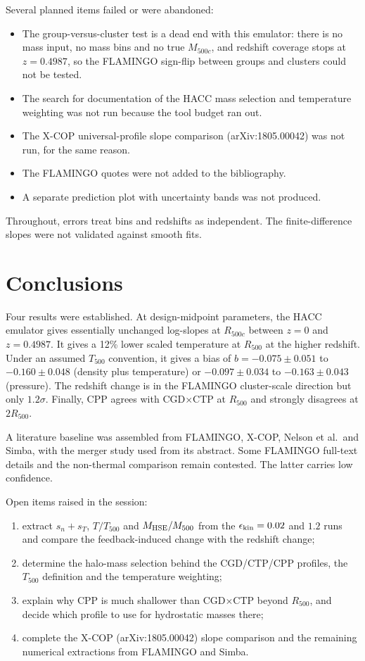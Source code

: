 \documentclass[11pt,a4paper]{article}
\begin{document}
Several planned items failed or were abandoned:
\begin{itemize}
\item The group-versus-cluster test is a dead end with this emulator: there is no mass input, no mass bins and no true $M_{500c}$, and redshift coverage stops at $z=0.4987$, so the FLAMINGO sign-flip between groups and clusters could not be tested.
\item The search for documentation of the HACC mass selection and temperature weighting was not run because the tool budget ran out.
\item The X-COP universal-profile slope comparison (arXiv:1805.00042) was not run, for the same reason.
\item The FLAMINGO quotes were not added to the bibliography.
\item A separate prediction plot with uncertainty bands was not produced.
\end{itemize}
Throughout, errors treat bins and redshifts as independent. The finite-difference slopes were not validated against smooth fits.

\section{Conclusions}

Four results were established. At design-midpoint parameters, the HACC emulator gives essentially unchanged log-slopes at $R_{500c}$ between $z=0$ and $z=0.4987$. It gives a 12\% lower scaled temperature at $R_{500}$ at the higher redshift. Under an assumed $T_{500}$ convention, it gives a bias of $b=-0.075\pm0.051$ to $-0.160\pm0.048$ (density plus temperature) or $-0.097\pm0.034$ to $-0.163\pm0.043$ (pressure). The redshift change is in the FLAMINGO cluster-scale direction but only $1.2\sigma$. Finally, CPP agrees with CGD$\times$CTP at $R_{500}$ and strongly disagrees at $2R_{500}$.

A literature baseline was assembled from FLAMINGO, X-COP, Nelson et al.\ and Simba, with the merger study used from its abstract. Some FLAMINGO full-text details and the non-thermal comparison remain contested. The latter carries low confidence.

Open items raised in the session:
\begin{enumerate}
\item extract $s_n+s_T$, $T/T_{500}$ and $M_{\rm HSE}/M_{500}$ from the $\epsilon_{\rm kin}=0.02$ and $1.2$ runs and compare the feedback-induced change with the redshift change;
\item determine the halo-mass selection behind the CGD/CTP/CPP profiles, the $T_{500}$ definition and the temperature weighting;
\item explain why CPP is much shallower than CGD$\times$CTP beyond $R_{500}$, and decide which profile to use for hydrostatic masses there;
\item complete the X-COP (arXiv:1805.00042) slope comparison and the remaining numerical extractions from FLAMINGO and Simba.
\end{enumerate}
\end{document}

